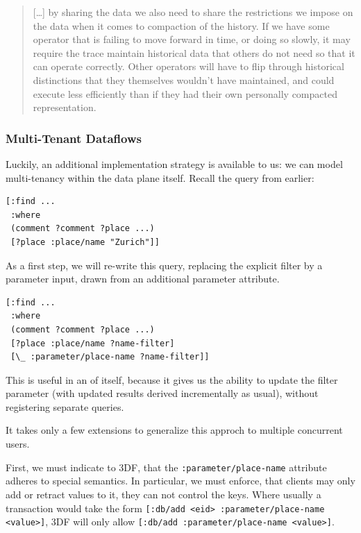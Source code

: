 \documentclass[../catalog.tex]{subfiles}
\begin{document}
\begin{quote}
[\ldots{}] by sharing the data we also need to share the restrictions
we impose on the data when it comes to compaction of the history. If
we have some operator that is failing to move forward in time, or
doing so slowly, it may require the trace maintain historical data
that others do not need so that it can operate correctly. Other
operators will have to flip through historical distinctions that they
themselves wouldn't have maintained, and could execute less
efficiently than if they had their own personally compacted
representation.

\cite{makingarrangements}
\end{quote}

\subsubsection{Multi-Tenant Dataflows}

Luckily, an additional implementation strategy is available to us: we
can model multi-tenancy within the data plane itself. Recall the query
from earlier:

\begin{verbatim}
[:find ...
 :where
 (comment ?comment ?place ...)
 [?place :place/name "Zurich"]]
\end{verbatim}

As a first step, we will re-write this query, replacing the explicit
filter by a parameter input, drawn from an additional parameter
attribute.

\begin{verbatim}
[:find ...
 :where
 (comment ?comment ?place ...)
 [?place :place/name ?name-filter]
 [\_ :parameter/place-name ?name-filter]]
\end{verbatim}

This is useful in an of itself, because it gives us the ability to
update the filter parameter (with updated results derived
incrementally as usual), without registering separate queries.

It takes only a few extensions to generalize this approch to multiple
concurrent users.

First, we must indicate to 3DF, that the
\texttt{:parameter/place-name} attribute adheres to special
semantics. In particular, we must enforce, that clients may only add
or retract values to it, they can not control the keys. Where usually
a transaction would take the form \texttt{[:db/add <eid>
    :parameter/place-name <value>]}, 3DF will only allow
\texttt{[:db/add :parameter/place-name <value>]}.
\end{document}
